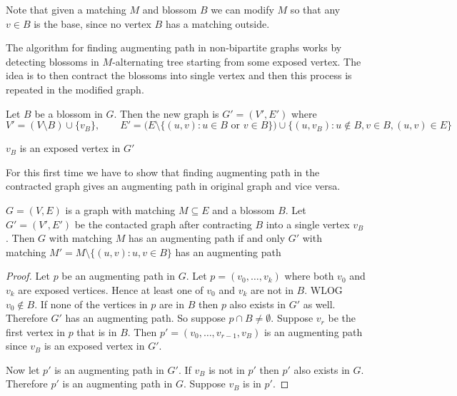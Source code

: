 Note that given a matching $M$ and blossom $B$ we can modify $M$ so that any $v\in B$ is the base, since no vertex $B$ has a matching outside. 

The algorithm for finding augmenting path in non-bipartite graphs works by detecting blossoms in $M$-alternating tree starting from some exposed vertex. The idea is to then contract the blossoms into single vertex and then this process is repeated in the modified graph. 

Let $B$ be a blossom in $G$. Then the new graph is $G'=(V',E')$ where $$V'=(V\setminus B)\cup \{v_B\},\qquad E'=\Big(E\setminus\{(u,v)\colon u\in B\text{ or }v\in B\}\Big)\cup \{(u,v_B)\colon u\notin B, v\in B, (u,v)\in E\}$$ 

\begin{observation}
	$v_B$ is an exposed vertex in $G'$
\end{observation}

For this first time we have to show that finding augmenting path in the contracted graph gives an augmenting path in original graph and vice versa. 


\begin{lemma}{}{}
	$G=(V,E)$ is a graph with matching $M\subseteq E$ and a blossom $B$. Let $G'=(V',E')$ be the contacted graph after contracting $B$ into a single vertex $v_B$. Then $G$ with matching $M$ has an augmenting path if and only $G'$ with matching $M'=M\setminus \{(u,v)\colon u,v\in B\}$ has an augmenting path 
\end{lemma}
\begin{proof}
	Let $p$ be an augmenting path in $G$. Let $p=(v_0,\dots, v_k)$ where both $v_0$ and $v_k$ are exposed vertices. Hence at least one of $v_0$ and $v_k$ are not in $B$. WLOG $v_0\notin B$. If none of the vertices in $p$ are in $B$ then $p$ also exists in $G'$ as well. Therefore $G'$ has an augmenting path. So suppose $p\cap B\neq \emptyset$. Suppose $v_r$ be the first vertex in $p$ that is in $B$. Then $p'=(v_0,\dots, v_{r-1}, v_B)$ is an augmenting path since $v_B$ is an exposed vertex in $G'$.
	
	Now let $p'$ is an augmenting path in $G'$. If $v_B$ is not in $p'$ then $p'$ also exists in $G$. Therefore $p'$ is an augmenting path in $G$. Suppose $v_B$ is in $p'$.
\end{proof}

